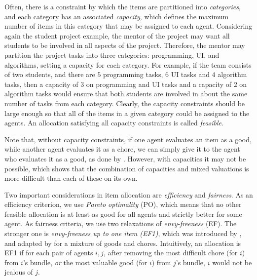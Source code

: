 \documentclass[sigconf]{aamas}
\theoremstyle{definition}
\begin{document}
Often, there is a constraint by which the items are partitioned into \emph{categories}, and each category has an associated \emph{capacity}, which defines the maximum number of items in this category that may be assigned to each agent. 
Considering again the student project example, 
the mentor of the project may want all students to be involved in all aspects of the project. Therefore, the mentor may partition the project tasks into three categories: programming, UI, and algorithms, setting a capacity for each category.
For example, if the team consists of two students, and there are $5$ programming tasks, $6$ UI tasks and $4$ algorithm tasks, then a capacity of $3$ on programming and UI tasks and a capacity of $2$ on algorithm tasks would ensure that both students are involved in about the same number of tasks from each category.
Clearly, the capacity constraints should be large enough so that all of the items in a given category could be assigned to the agents. An allocation satisfying all capacity constraints is called \emph{feasible}.

Note that, without capacity constraints, if one agent  evaluates an item as a good, while another agent evaluates it as a chore, we can simply give it to the agent who evaluates it as a good, as done by \citet{aziz2022fair}. However, with capacities it may not be possible, which shows that the combination of capacities and mixed valuations is more difficult than each of these on its own.

Two important considerations in item allocation are \emph{efficiency} and \emph{fairness}.
As an efficiency criterion, we use \emph{Pareto optimality} (PO), which means that no other feasible allocation is at least as good for all agents and strictly better for some agent.
As fairness criteria, we use two relaxations of \emph{envy-freeness} (EF). 
The stronger one is \emph{envy-freeness up to one item (EF1)}, which was
introduced by \citet{budish2011}, and 
adapted by \citet{aziz2022fair} for a mixture of goods and chores. Intuitively, an allocation is EF1 if for each pair of agents $i,j$, after removing the most difficult chore (for $i$) from $i$'s bundle, \emph{or} the most valuable good (for $i$) from $j$'s bundle, $i$ would not be jealous of $j$. 
\end{document}
